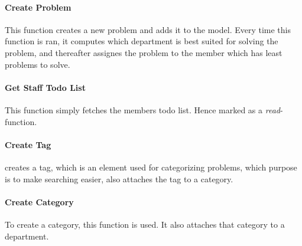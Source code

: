 
\paragraph{Create Problem} This function creates a new problem and adds it to the model. Every time this function is ran, it computes which department is best suited for solving the problem, and thereafter assignes the problem to the \astaff[] member which has least problems to solve.  


\paragraph{Get Staff Todo List} This function simply fetches the \astaff[] members todo list. Hence marked as a \textit{read}-function. 

\paragraph{Create Tag} creates a tag, which is an element used for categorizing problems, which purpose is to make searching easier, also attaches the tag to a category.

\paragraph{Create Category} To create a category, this function is used. It also attaches that category to a department. 

